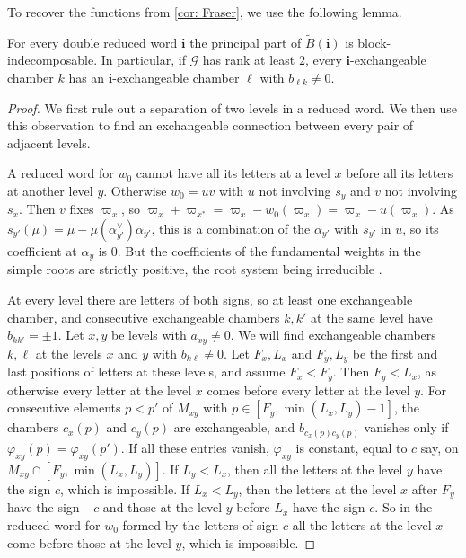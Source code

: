 \documentclass[a4paper]{amsart}
\numberwithin{equation}{section}
\theoremstyle{definition}
\theoremstyle{remark}
\newcommand{\mcG}{\mathcal{G}}
\newcommand{\bfi}{\mathbf{i}}
\newcommand{\tB}{\widetilde{B}}
\begin{document}
To recover the functions from \cref{cor: Fraser}, we use the following lemma.

\begin{lemma}
  \label{lem: BFZ indecomposable}
  For every double reduced word $\bfi$ the principal part of $\tB(\bfi)$ is block-indecomposable.
  In particular, if $\mcG$ has rank at least $2$, every $\bfi$-exchangeable chamber $k$ has an $\bfi$-exchangeable chamber $\ell$ with $b_{\ell k}\neq0$.
\end{lemma}
\begin{proof}
We first rule out a separation of two levels in a reduced word.
We then use this observation to find an exchangeable connection between every pair of adjacent levels.

  A reduced word for $w_0$ cannot have all its letters at a level $x$ before all its letters at another level $y$.
  Otherwise $w_0=uv$ with $u$ not involving $s_y$ and $v$ not involving $s_x$.
  Then $v$ fixes $\varpi_x$, so $\varpi_x+\varpi_{x^*}=\varpi_x-w_0(\varpi_x)=\varpi_x-u(\varpi_x)$.
  As $s_{y'}(\mu)=\mu-\mu(\alpha_{y'}^\vee)\alpha_{y'}$, this is a combination of the $\alpha_{y'}$ with $s_{y'}$ in $u$, so its coefficient at $\alpha_y$ is $0$.
  But the coefficients of the fundamental weights in the simple roots are strictly positive, the root system being irreducible \cite[Theorem~4.3 (Fin)]{Kac90}.

  At every level there are letters of both signs, so at least one exchangeable chamber, and consecutive exchangeable chambers $k,k'$ at the same level have $b_{kk'}=\pm1$.
  Let $x,y$ be levels with $a_{xy}\neq0$. We will find exchangeable chambers $k,\ell$ at the levels $x$ and $y$ with $b_{k\ell}\neq0$.
  Let $F_x,L_x$ and $F_y,L_y$ be the first and last positions of letters at these levels, and assume $F_x<F_y$.
  Then $F_y<L_x$, as otherwise every letter at the level $x$ comes before every letter at the level $y$.
  For consecutive elements $p<p'$ of $M_{xy}$ with $p\in[F_y,\min(L_x,L_y)-1]$, the chambers $c_x(p)$ and $c_y(p)$ are exchangeable, and $b_{c_x(p)c_y(p)}$ vanishes only if $\varphi_{xy}(p)=\varphi_{xy}(p')$.
  If all these entries vanish, $\varphi_{xy}$ is constant, equal to $c$ say, on $M_{xy}\cap[F_y,\min(L_x,L_y)]$.
  If $L_y<L_x$, then all the letters at the level $y$ have the sign $c$, which is impossible.
  If $L_x<L_y$, then the letters at the level $x$ after $F_y$ have the sign $-c$ and those at the level $y$ before $L_x$ have the sign $c$.
  So in the reduced word for $w_0$ formed by the letters of sign $c$ all the letters at the level $x$ come before those at the level $y$, which is impossible.
\end{proof}
\end{document}
